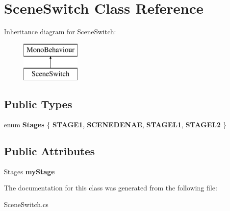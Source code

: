 \hypertarget{class_scene_switch}{}\section{Scene\+Switch Class Reference}
\label{class_scene_switch}
Inheritance diagram for Scene\+Switch\+:\begin{figure}[H]
\begin{center}
\leavevmode
\includegraphics[height=2.000000cm]{class_scene_switch}
\end{center}
\end{figure}
\subsection*{Public Types}
\begin{DoxyCompactItemize}
\item 
\hypertarget{class_scene_switch_ace7e42686aab3de3d3e557cfda84619a}{}\label{class_scene_switch_ace7e42686aab3de3d3e557cfda84619a} 
enum {\bfseries Stages} \{ {\bfseries S\+T\+A\+G\+E1}, 
{\bfseries S\+C\+E\+N\+E\+D\+E\+N\+AE}, 
{\bfseries S\+T\+A\+G\+E\+L1}, 
{\bfseries S\+T\+A\+G\+E\+L2}
 \}
\end{DoxyCompactItemize}
\subsection*{Public Attributes}
\begin{DoxyCompactItemize}
\item 
\hypertarget{class_scene_switch_a4c670b4004c0e5259675872144f9dc6c}{}\label{class_scene_switch_a4c670b4004c0e5259675872144f9dc6c} 
Stages {\bfseries my\+Stage}
\end{DoxyCompactItemize}


The documentation for this class was generated from the following file\+:\begin{DoxyCompactItemize}
\item 
Scene\+Switch.\+cs\end{DoxyCompactItemize}
